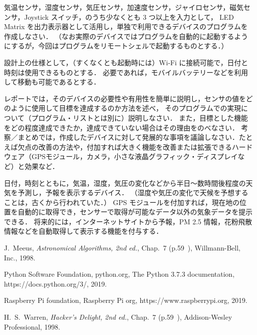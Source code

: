 \documentclass[11pt,a4,epsf]{report}
\begin{document}
\begin{subject}
気温センサ，湿度センサ，気圧センサ，加速度センサ，ジャイロセンサ，磁気センサ，Joystick スイッチ，のうち少なくとも 3 つ以上を入力として，
LED Matrix を出力表示器として活用し，単独で利用できるデバイスのプログラムを作成しなさい．
（なお実際のデバイスではプログラムを自動的に起動するようにするが，今回はプログラムをリモートシェルで起動するものとする．）

設計上の仕様として，（すくなくとも起動時には）Wi-Fi に接続可能で，日付と時刻は使用できるものとする．
必要であれば，モバイルバッテリーなどを利用して移動も可能であるとする．

レポートでは，そのデバイスの必要性や有用性を簡単に説明し，センサの値をどのように使用して目標を達成するのか方法を述べ，
そのプログラムでの実現について（プログラム・リストとは別に）説明しなさい．
また，目標とした機能をどの程度達成できたか，達成できていない場合はその理由をのべなさい．
考察／まとめでは，作成したデバイスに対して発展的な事項を議論しなさい．たとえば欠点の改善の方法や，付加すれば大きく機能を改善または拡張できるハードウェア（GPSモジュール，カメラ，小さな液晶グラフィック・ディスプレイなど）と効果など．
\end{subject}

\begin{example}
日付，時刻とともに，気温，湿度，気圧の変化などから半日〜数時間後程度の天気を予測し，予報を表示するデバイス．
（湿度や気圧の変化で天候を予想することは，古くから行われていた．）
GPS モジュールを付加すれば，現在地の位置を自動的に取得でき，センサーで取得が可能なデータ以外の気象データを提示できる．
将来的には，インターネットサイトから予報，PM 2.5 情報，花粉飛散情報などを自動取得して表示する機能を付与する．
\end{example}

\begin{thebibliography}{10}
 
J.~Meeus, {\em Astronomical Algorithms, 2nd ed.}, Chap.~7 (p.59~), Willmann-Bell, Inc., 1998. 

 Python Software Foundation, python.org, The Python 3.7.3 documentation, 
{\sf https://docs.python.org/3/}, 2019.

Raspberry Pi foundation, Raspberry Pi org, {\sf https://www.raspberrypi.org}, 2019. 

H.~S.~Warren, {\em Hacker’s Delight, 2nd ed.}, Chap.~7 (p.59~), Addison-Wesley Professional, 1998. 

\end{thebibliography}
\end{document}
